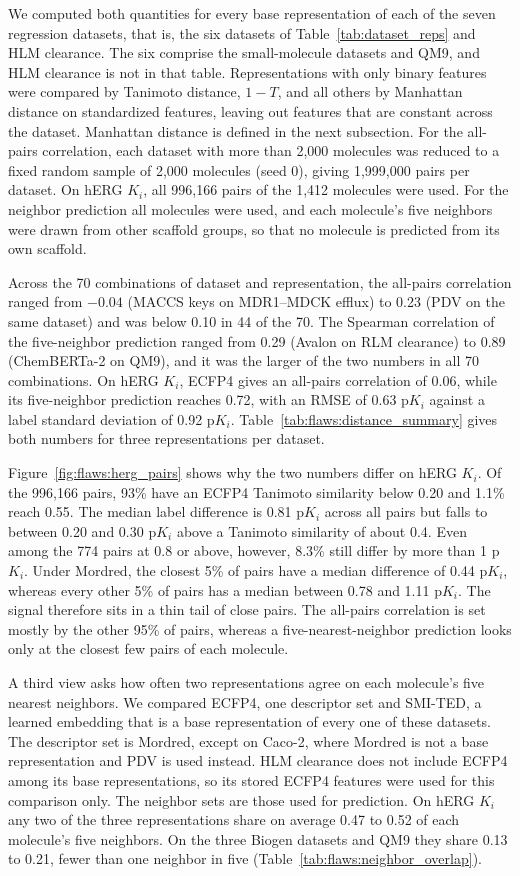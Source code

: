 We computed both quantities for every base representation of each of the seven regression datasets, that is, the six datasets of Table~\ref{tab:dataset_reps} and HLM clearance. The six comprise the small-molecule datasets and QM9, and HLM clearance is not in that table. Representations with only binary features were compared by Tanimoto distance, $1-T$, and all others by Manhattan distance on standardized features, leaving out features that are constant across the dataset. Manhattan distance is defined in the next subsection. For the all-pairs correlation, each dataset with more than 2,000 molecules was reduced to a fixed random sample of 2,000 molecules (seed 0), giving 1,999,000 pairs per dataset. On hERG $K_i$, all 996,166 pairs of the 1,412 molecules were used. For the neighbor prediction all molecules were used, and each molecule's five neighbors were drawn from other scaffold groups, so that no molecule is predicted from its own scaffold.

Across the 70 combinations of dataset and representation, the all-pairs correlation ranged from $-0.04$ (MACCS keys on MDR1--MDCK efflux) to 0.23 (PDV on the same dataset) and was below 0.10 in 44 of the 70. The Spearman correlation of the five-neighbor prediction ranged from 0.29 (Avalon on RLM clearance) to 0.89 (ChemBERTa-2 on QM9), and it was the larger of the two numbers in all 70 combinations. On hERG $K_i$, ECFP4 gives an all-pairs correlation of 0.06, while its five-neighbor prediction reaches 0.72, with an RMSE of 0.63 p$K_i$ against a label standard deviation of 0.92 p$K_i$. Table~\ref{tab:flaws:distance_summary} gives both numbers for three representations per dataset.

Figure~\ref{fig:flaws:herg_pairs} shows why the two numbers differ on hERG $K_i$. Of the 996,166 pairs, 93\% have an ECFP4 Tanimoto similarity below 0.20 and 1.1\% reach 0.55. The median label difference is 0.81 p$K_i$ across all pairs but falls to between 0.20 and 0.30 p$K_i$ above a Tanimoto similarity of about 0.4. Even among the 774 pairs at 0.8 or above, however, 8.3\% still differ by more than 1 p$K_i$. Under Mordred, the closest 5\% of pairs have a median difference of 0.44 p$K_i$, whereas every other 5\% of pairs has a median between 0.78 and 1.11 p$K_i$. The signal therefore sits in a thin tail of close pairs. The all-pairs correlation is set mostly by the other 95\% of pairs, whereas a five-nearest-neighbor prediction looks only at the closest few pairs of each molecule.

A third view asks how often two representations agree on each molecule's five nearest neighbors. We compared ECFP4, one descriptor set and SMI-TED, a learned embedding that is a base representation of every one of these datasets. The descriptor set is Mordred, except on Caco-2, where Mordred is not a base representation and PDV is used instead. HLM clearance does not include ECFP4 among its base representations, so its stored ECFP4 features were used for this comparison only. The neighbor sets are those used for prediction. On hERG $K_i$ any two of the three representations share on average 0.47 to 0.52 of each molecule's five neighbors. On the three Biogen datasets and QM9 they share 0.13 to 0.21, fewer than one neighbor in five (Table~\ref{tab:flaws:neighbor_overlap}).

